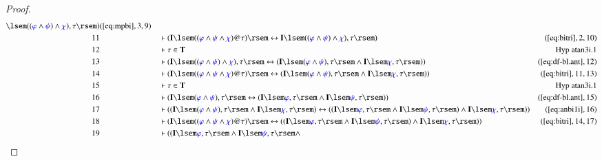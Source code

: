 \begin{proof}
\begin{align}
      \lsem ( ( \mw{\varphi} \wedge \mw{\psi} ) \wedge
      \mw{\chi} ) , \tau \rsem
      )&(\mbox{\ref{eq:mpbi}},3,9)\notag
  \\ 11 &&  & \vdash ( \mathbf{I} \lsem ( ( \mw{\varphi} \wedge \mw{\psi}
      \wedge \mw{\chi} ) @ \tau ) \rsem \leftrightarrow
      \mathbf{I} \lsem ( ( \mw{\varphi} \wedge \mw{\psi} )
      \wedge \mw{\chi} ) , \tau \rsem
      )&(\mbox{\ref{eq:bitri}},2,10)\notag
  \\ 12 &&  & \vdash \tau \in \mathbf{T}&\text{Hyp~atan3i.1}\notag%
  \\ 13 &&  & \vdash ( \mathbf{I} \lsem ( ( \mw{\varphi} \wedge \mw{\psi} )
      \wedge \mw{\chi} ) , \tau \rsem \leftrightarrow (
      \mathbf{I} \lsem ( \mw{\varphi} \wedge \mw{\psi} ) ,
      \tau \rsem \wedge \mathbf{I} \lsem \mw{\chi} , \tau
      \rsem ) )&(\mbox{\ref{eq:df-bl.ant}},12)\notag
  \\ 14 &&  & \vdash ( \mathbf{I} \lsem ( ( \mw{\varphi} \wedge \mw{\psi}
      \wedge \mw{\chi} ) @ \tau ) \rsem \leftrightarrow (
      \mathbf{I} \lsem ( \mw{\varphi} \wedge \mw{\psi} ) ,
      \tau \rsem \wedge \mathbf{I} \lsem \mw{\chi} , \tau
      \rsem ) )&(\mbox{\ref{eq:bitri}},11,13)\notag
  \\ 15 &&  & \vdash \tau \in \mathbf{T}&\text{Hyp~atan3i.1}\notag%
  \\ 16 &&  & \vdash ( \mathbf{I} \lsem ( \mw{\varphi} \wedge \mw{\psi} ) ,
      \tau \rsem \leftrightarrow ( \mathbf{I} \lsem
      \mw{\varphi} , \tau \rsem \wedge \mathbf{I} \lsem
      \mw{\psi} , \tau \rsem )
      )&(\mbox{\ref{eq:df-bl.ant}},15)\notag
  \\ 17 &&  & \vdash ( ( \mathbf{I} \lsem ( \mw{\varphi} \wedge \mw{\psi} ) ,
      \tau \rsem \wedge \mathbf{I} \lsem \mw{\chi} , \tau
      \rsem ) \leftrightarrow ( ( \mathbf{I} \lsem
      \mw{\varphi} , \tau \rsem \wedge \mathbf{I} \lsem
      \mw{\psi} , \tau \rsem ) \wedge \mathbf{I} \lsem
      \mw{\chi} , \tau \rsem )
      )&(\mbox{\ref{eq:anbi1i}},16)\notag
  \\ 18 &&  & \vdash ( \mathbf{I} \lsem ( ( \mw{\varphi} \wedge \mw{\psi}
      \wedge \mw{\chi} ) @ \tau ) \rsem \leftrightarrow ( (
      \mathbf{I} \lsem \mw{\varphi} , \tau \rsem \wedge
      \mathbf{I} \lsem \mw{\psi} , \tau \rsem ) \wedge
      \mathbf{I} \lsem \mw{\chi} , \tau \rsem )
      )&(\mbox{\ref{eq:bitri}},14,17)\notag
  \\ 19 &&  & \vdash ( ( \mathbf{I} \lsem \mw{\varphi} , \tau \rsem \wedge
      \mathbf{I} \lsem \mw{\psi} , \tau \rsem \wedge

\end{align}
\end{proof}
